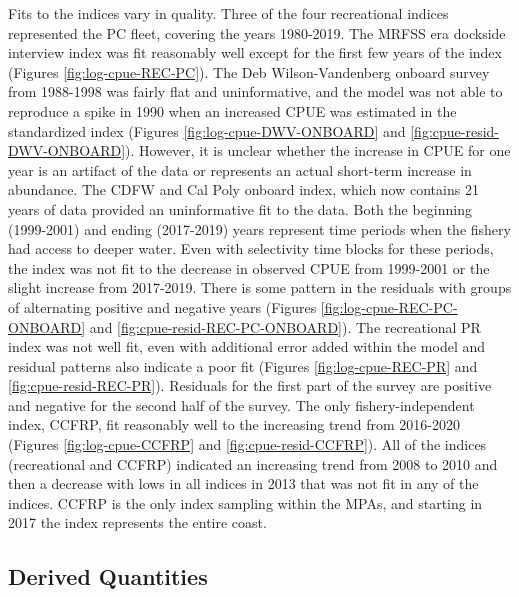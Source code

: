 \documentclass[
  english,
  a4paper,
]{article}
\begin{document}
Fits to the indices vary in quality. Three of the four recreational indices represented the PC fleet, covering the years 1980-2019.
The MRFSS era dockside interview index was fit reasonably well except for the first few years of the index (Figures \ref{fig:log-cpue-REC-PC}). The Deb Wilson-Vandenberg onboard survey from 1988-1998 was fairly flat and uninformative, and the model was not able to reproduce a spike in 1990 when an increased CPUE was estimated in the standardized index (Figures \ref{fig:log-cpue-DWV-ONBOARD} and \ref{fig:cpue-resid-DWV-ONBOARD}). However, it is unclear whether the increase in CPUE for one year is an artifact of the data or represents an actual short-term increase in abundance. The CDFW and Cal Poly onboard index, which now contains 21 years of data provided an uninformative fit to the data. Both the beginning (1999-2001) and ending (2017-2019) years represent time periods when the fishery had access to deeper water. Even with selectivity time blocks for these periods, the index was not fit to the decrease in observed CPUE from 1999-2001 or the slight increase from 2017-2019. There is some pattern in the residuals with groups of alternating positive and negative years (Figures \ref{fig:log-cpue-REC-PC-ONBOARD} and \ref{fig:cpue-resid-REC-PC-ONBOARD}).
The recreational PR index was not well fit, even with additional error added within the model and residual patterns
also indicate a poor fit (Figures \ref{fig:log-cpue-REC-PR} and \ref{fig:cpue-resid-REC-PR}). Residuals for the
first part of the survey are positive and negative for the second half of the survey. The only fishery-independent
index, CCFRP, fit reasonably well to the increasing trend from 2016-2020 (Figures \ref{fig:log-cpue-CCFRP} and \ref{fig:cpue-resid-CCFRP}). All of the indices (recreational and CCFRP) indicated an increasing trend from
2008 to 2010 and then a decrease with lows in all indices in 2013 that was not fit in any of the indices. CCFRP
is the only index sampling within the MPAs, and starting in 2017 the index represents the entire coast.

\hypertarget{derived-quantities}{%
\subsection{Derived Quantities}\label{derived-quantities}}
\end{document}

